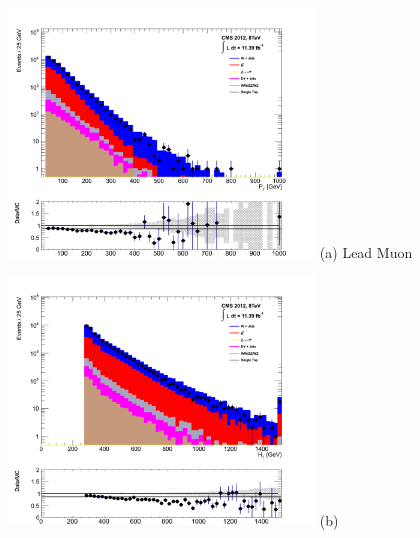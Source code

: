 \begin{itemize}
\begin{minipage}{\linewidth}
\centering
\begin{minipage}{.48\textwidth}
\centering
\includegraphics[width = 3.2in]{plots/muon_leadmu_datamc.pdf}
(a) Lead Muon \pt
\end{minipage}
\begin{minipage}{.48\textwidth}
\centering
\includegraphics[width = 3.2in]{plots/muon_ht_datamc.pdf}
(b) \theht
\end{minipage}
\end{minipage}

\xspace


\end{itemize}
